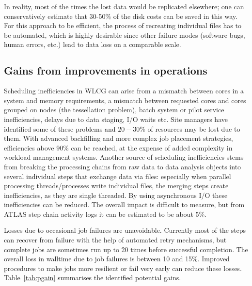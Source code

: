 In reality, most of the times the lost data would be replicated
elsewhere; one can conservatively estimate that 30-50\% of the disk
costs can be saved in this way. For this approach to be efficient, the
process of recreating individual files has to be automated, which is
highly desirable since other failure modes (software bugs, human
errors, etc.) lead to data loss on a comparable scale.

\subsection{Gains from improvements in operations}
Scheduling inefficiencies in WLCG can arise from a mismatch between
cores in a system and memory requirements, a mismatch between
requested cores and cores grouped on nodes (the tessellation problem),
batch system or pilot service inefficiencies, delays due to data
staging, I/O waits etc. Site managers have identified some of these
problems and $20-30\%$ of resources may be lost due to them. With
advanced backfilling and more complex job placement strategies,
efficiencies above 90\% can be reached, at the expense of added
complexity in workload management systems. Another source of
scheduling inefficiencies stems from breaking the processing chains
from raw data to data analysis objects into several individual steps
that exchange data via files: especially when parallel processing
threads/processes write individual files, the merging steps create
inefficiencies, as they are single threaded. By using asynchronous I/O
these inefficiencies can be reduced. The overall impact is difficult
to measure, but from ATLAS step chain activity logs it can be
estimated to be about 5\%.

Losses due to occasional job failures are unavoidable. Currently most
of the steps can recover from failure with the help of automated retry
mechanisms, but complete jobs are sometimes run up to 20 times before
successful completion. The overall loss in walltime due to job
failures is between 10 and 15\%. Improved procedures to make jobs more
resilient or fail very early can reduce these losses.
Table~\ref{tab:pgain} summarises the identified potential gains.

